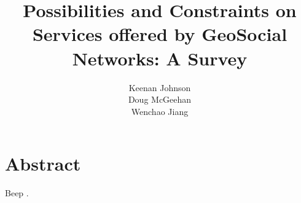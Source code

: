 \documentclass[11pt]{article}
\title{Possibilities and Constraints on Services offered by GeoSocial Networks: A Survey}
\author{Keenan Johnson\\
		Doug McGeehan\\
		Wenchao Jiang}
\begin{document}
\maketitle

\section{Abstract}

Beep \cite{carbunar_you_2012}\cite{carbunar_:_2014}\cite{carbunar_shy_2012}\cite{yoon_social_2012}\cite{carbunar_private_2014}\cite{mascetti_privacy_2011}\cite{puttaswamy_preserving_2014}\cite{cheng_personalized_2011}\cite{bao_partner-marketing_2014}\cite{li_nearby_2013}\cite{zheng_mining_2012}\cite{ruiz_vicente_location-related_2011}\cite{bao_location-based_2012}\cite{levandoski_lars:_2012}\cite{karamshuk_geo-spotting:_2013}\cite{wang_face--face_2012}\cite{scellato_exploiting_2011}\cite{ye_exploiting_2011}\cite{chen_discovering_2011}\cite{wei_constructing_2012}\cite{lin_moving-object_2011}.

{}

\end{document}
